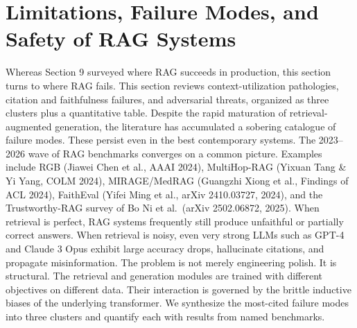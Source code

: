 \documentclass{article}
\begin{document}
\section{Limitations, Failure Modes, and Safety of RAG Systems}\label{limitations-failure-modes-and-safety-of-rag-systems}

Whereas Section 9 surveyed where RAG succeeds in production, this section turns to where RAG fails. This section reviews context-utilization pathologies, citation and faithfulness failures, and adversarial threats, organized as three clusters plus a quantitative table. Despite the rapid maturation of retrieval-augmented generation, the literature has accumulated a sobering catalogue of failure modes. These persist even in the best contemporary systems. The 2023--2026 wave of RAG benchmarks converges on a common picture. Examples include RGB (Jiawei Chen et al., AAAI 2024), MultiHop-RAG (Yixuan Tang \& Yi Yang, COLM 2024), MIRAGE/MedRAG (Guangzhi Xiong et al., Findings of ACL 2024), FaithEval (Yifei Ming et al., arXiv 2410.03727, 2024), and the Trustworthy-RAG survey of Bo Ni et al.~(arXiv 2502.06872, 2025). When retrieval is perfect, RAG systems frequently still produce unfaithful or partially correct answers. When retrieval is noisy, even very strong LLMs such as GPT-4 and Claude 3 Opus exhibit large accuracy drops, hallucinate citations, and propagate misinformation. The problem is not merely engineering polish. It is structural. The retrieval and generation modules are trained with different objectives on different data. Their interaction is governed by the brittle inductive biases of the underlying transformer. We synthesize the most-cited failure modes into three clusters and quantify each with results from named benchmarks.
\end{document}
